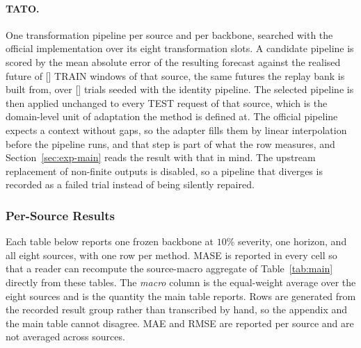 \documentclass{article}
\newcommand{\ph}[1]{\textcolor{phgray}{\textsf{[\detokenize{#1}]}}}
\begin{document}
\paragraph{TATO.} One transformation pipeline per source and per backbone, searched with the
official implementation over its eight transformation slots. A candidate pipeline is scored by
the mean absolute error of the resulting forecast against the realised future of
\ph{TATO_WINDOWS} TRAIN windows of that source, the same futures the replay bank is built from,
over \ph{TATO_TRIALS} trials seeded with the identity pipeline. The selected pipeline is then
applied unchanged to every TEST request of that source, which is the domain-level unit of
adaptation the method is defined at. The official pipeline expects a context without gaps, so
the adapter fills them by linear interpolation before the pipeline runs, and that step is
part of what the row measures, and Section~\ref{sec:exp-main} reads the result with that in
mind. The upstream replacement of non-finite outputs is disabled, so a pipeline that diverges
is recorded as a failed trial instead of being silently repaired.

\subsubsection{Per-Source Results}
\label{app:datasets}
Each table below reports one frozen backbone at $10\%$ severity, one horizon, and
all eight sources, with one row per method. MASE is reported in every cell so that a
reader can recompute the source-macro aggregate of Table~\ref{tab:main} directly from
these tables. The \emph{macro} column is the equal-weight average over the eight sources
and is the quantity the main table reports. Rows are generated from the recorded result
group rather than transcribed by hand, so the appendix and the main table cannot disagree.
MAE and RMSE are reported per source and are not averaged across sources.
\end{document}
